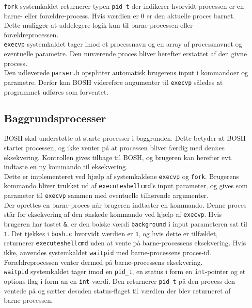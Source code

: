 \texttt{fork} systemkaldet returnerer typen \texttt{pid\_t} der indikerer hvorvidt processen er en barne- eller forældre-process. Hvis værdien er 0 er den aktuelle proces barnet. Dette muliggør at uddelegere logik kun til barne-processen eller forældreprocessen.\\

\texttt{execvp} systemkaldet tager imod et processnavn og en array af processnavnet og eventuelle parametre. Den nuværende proces bliver herefter erstattet af den givne process.\\

Den udleverede \texttt{parser.h} opsplitter automatisk brugerens input i kommandoer og parametre. Derfor kan BOSH videreføre augumenter til \texttt{execvp} således at programmet udføres som forventet.
\subsection{Baggrundsprocesser}
BOSH skal understøtte at starte processer i baggrunden. Dette betyder at BOSH starter processen, og ikke venter på at processen bliver færdig med dennes eksekvering. Kontrollen gives tilbage til BOSH, og brugeren kan herefter evt. indtaste en ny kommando til eksekvering.\\

Dette er implementeret ved hjælp af systemkaldene \texttt{execvp} og \texttt{fork}. Brugerens kommando bliver trukket ud af \texttt{executeshellcmd}'s input parameter, og gives som parameter til \texttt{execvp} sammen med eventuelle tilhørende argumenter. \\

Der oprettes en barne-proces når brugeren indtaster en kommando. Denne proces står for eksekvering af den ønskede kommando ved hjælp af \texttt{execvp}. Hvis brugeren har tastet \texttt{\&}, er den bolske værdi \texttt{background} i input parameteren sat til \texttt{1}. Det tjekkes i \texttt{bosh.c} hvorvidt værdien er \texttt{1}, og hvis dette er tilfældet, returnerer \texttt{executeshellcmd} uden at vente på barne-processens eksekvering. Hvis ikke, anvendes systemkaldet \texttt{waitpid} med barne-processens proces-id. Forældreprocessen venter dermed på barne-processens eksekvering.\\

\texttt{waitpid} systemkaldet tager imod en \texttt{pid\_t}, en status i form en \texttt{int}-pointer og et options-flag i form an en \texttt{int}-værdi. Den returnerer \texttt{pid\_t} på den process den ventede på og sætter desuden status-flaget til værdien der blev returneret af barne-processen.

